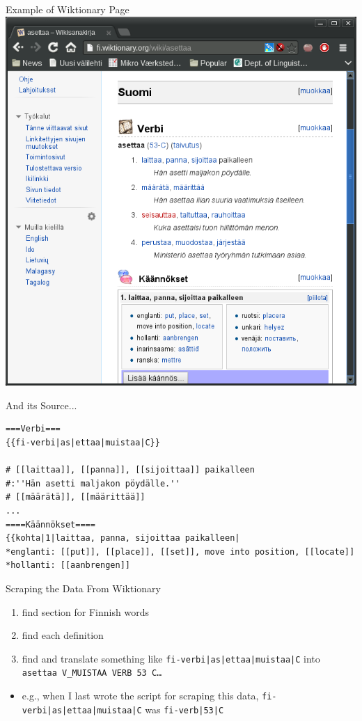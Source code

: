 \documentclass[t,12pt]{beamer}
\begin{document}
\begin{frame}[plain]{Example of Wiktionary Page}
    \includegraphics[keepaspectratio=true,width=1\paperwidth]{fiwikt-web}
\end{frame}

\begin{frame}[fragile]{And its Source...}
    \begin{verbatim}
===Verbi===
{{fi-verbi|as|ettaa|muistaa|C}}

# [[laittaa]], [[panna]], [[sijoittaa]] paikalleen
#:''Hän asetti maljakon pöydälle.''
# [[määrätä]], [[määrittää]]
...
====Käännökset====
{{kohta|1|laittaa, panna, sijoittaa paikalleen|
*englanti: [[put]], [[place]], [[set]], move into position, [[locate]]
*hollanti: [[aanbrengen]]
\end{verbatim}
\end{frame}

\begin{frame}{Scraping the Data From Wiktionary}
    \begin{enumerate}
        \item find section for Finnish words
        \item find each definition
        \item find and translate something like
            \texttt{fi-verbi|as|ettaa|muistaa|C}
                into \texttt{asettaa V\_MUISTAA VERB 53 C\ldots}
    \end{enumerate}
    \begin{itemize}
        \item e.g., when I last wrote the script for scraping this data,
            \texttt{fi-verbi|as|ettaa|muistaa|C} was \texttt{fi-verb|53|C}
    \end{itemize}
\end{frame}
\end{document}
